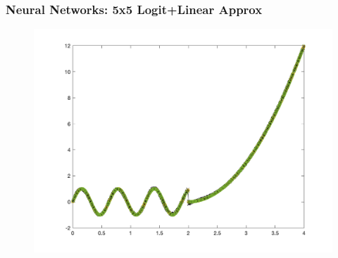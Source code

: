 \documentclass{beamer}
\begin{document}
\begin{frame}
\frametitle[alignment=center]{Neural Networks: 5x5 Logit+Linear Approx}
\begin{figure}
\includegraphics[scale=0.5]{NN_Example/Deep_7_7.png}
\end{figure}
\end{frame}


\end{document}
